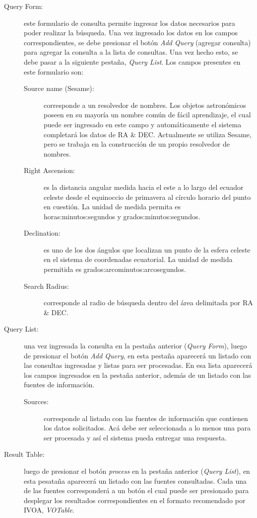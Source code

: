 \begin{description}
  \item [Query Form:] este formulario de consulta permite ingresar los
    datos necesarios para poder realizar la búsqueda. Una vez
    ingresado los datos en los campos correspondientes, se debe
    presionar el botón \emph{Add Query} (agregar consulta) para
    agregar la consulta a la lista de consultas. Una vez hecho esto,
    se debe pasar a la siguiente pestaña, \emph{Query List}. Los
    campos presentes en este formulario son:
    \begin{description}
      \item [Source name (Sesame):] corresponde a un resolvedor de
	nombres. Los objetos astronómicos poseen en su mayoría un
	nombre común de fácil aprendizaje, el cual puede ser ingresado
	en este campo y automáticamente el sistema completará los
	datos de RA \& DEC. Actualmente se utiliza Sesame, pero se
	trabaja en la construcción de un propio resolvedor de nombres.
      \item [Right Ascension:] es la distancia angular medida hacia el
	este a lo largo del ecuador celeste desde el equinoccio de
	primavera al círculo horario del punto en cuestión. La unidad
	de medida permita es horas:minutos:segundos y grados:minutos:segundos.
      \item [Declination:] es uno de los dos ángulos que localizan un
	punto de la esfera celeste en el sistema de coordenadas
	ecuatorial. La unidad de medida permitida es
	grados:arcominutos:arcosegundos.
      \item [Search Radius:] corresponde al radio de búsqueda dentro
	del área delimitada por RA \& DEC.
    \end{description}
  \item [Query List:] una vez ingresada la consulta en la pestaña
    anterior (\emph{Query Form}), luego de presionar el botón
    \emph{Add Query}, en esta pestaña aparecerá un listado con las
    consultas ingresadas y listas para ser procesadas. En esa lista
    aparecerá los campos ingresados en la pestaña anterior, además de
    un listado con las fuentes de información.
    \begin{description}
      \item [Sources:] corresponde al listado con las fuentes de
	información que contienen los datos solicitados. Acá debe ser
	seleccionada a lo menos una para ser procesada y así el
	sistema pueda entregar una respuesta.
    \end{description}
  \item [Result Table:] luego de presionar el botón \emph{process} en
    la pestaña anterior (\emph{Query List}), en esta pesataña
    aparecerá un listado con las fuentes consultadas. Cada una de las
    fuentes corresponderá a un botón el cual puede ser presionado para
    desplegar los resultados correspondientes en el formato
    recomendado por IVOA, \emph{VOTable}.
\end{description}  


